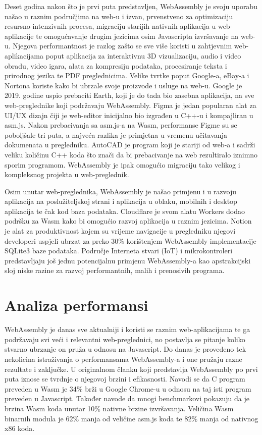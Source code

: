 \documentclass[seminarskirad]{fer}
\begin{document}
Deset godina nakon što je prvi puta predstavljen, WebAssembly je svoju uporabu našao u raznim područjima na web-u i izvan, prvenstveno za optimizaciju resursno intenzivnih procesa, migraciju starijih nativnih aplikacija u web-aplikacije te omogućavanje drugim jezicima osim Javascripta izvršavanje na web-u. Njegova performantnost je razlog zašto se sve više koristi u zahtjevnim web-aplikacijama poput aplikacija za interaktivnu 3D vizualizaciju, audio i video obradu, video igara, alata za kompresiju podataka, procesiranje teksta i prirodnog jezika te PDF preglednicima. Velike tvrtke poput Google-a, eBay-a i Nortona koriste kako bi ubrzale svoje proizvode i usluge na web-u. Google je 2019. godine uspio prebaciti Earth, koji je do tada bio zasebna aplikacija, na sve web-preglednike koji podržavaju WebAssembly. Figma je jedan popularan alat za UI/UX dizajn čiji je web-editor inicijalno bio izgrađen u C++-u i kompajliran u asm.js. Nakon prebacivanja sa asm.js-a na Wasm, performanse Figme su se poboljšale tri puta, a najveća razlika je primjetna u vremenu učitavanja dokumenata u pregledniku. AutoCAD je program koji je stariji od web-a i sadrži veliku količinu C++ koda što znači da bi prebacivanje na web	rezultiralo iznimno sporim programom. WebAssembly je ipak omogućio migraciju tako velikog i kompleksnog projekta u web-preglednik.

Osim unutar web-preglednika, WebAssembly je našao primjenu i u razvoju aplikacija na poslužiteljskoj strani i aplikacija u oblaku, mobilnih i desktop aplikacija te čak kod baza podataka. Cloudflare je svom alatu Workers dodao podršku za Wasm kako bi omogućio razvoj aplikacija u raznim jezicima. Notion je alat za produktivnost kojem su vrijeme navigacije u pregledniku njegovi developeri uspjeli ubrzat za preko 30\% korištenjem WebAssembly implementacije SQLite3 baze podataka. Područje Interneta stvari (IoT) i mikrokontroleri predstavljaju još jednu potencijalnu primjenu WebAssembly-a kao apstrakcijski sloj niske razine za razvoj performantnih, malih i prenosivih programa.


\chapter{Analiza performansi}
\label{pog:performance}

WebAssembly je danas sve aktualniji i koristi se raznim web-aplikacijama te ga podržavaju svi veći i relevantni web-preglednici, no postavlja se pitanje koliko stvarno ubrzanje on pruža u odnosu na Javascript. Do danas je provedeno tek nekolicina istraživanja o performansama WebAssembly-a i one pružaju razne rezultate i zaključke. U originalnom članku koji predstavlja WebAssembly po prvi puta iznose se tvrdnje o njegovoj brzini i efikasnosti. Navodi se da C program preveden u Wasm je 34\% brži u Google Chrome-u u odnosu na taj isti program preveden u Javascript. Također navode da mnogi benchmarkovi pokazuju da je brzina Wasm koda unutar 10\% nativne brzine izvršavanja. Veličina Wasm binarnih modula je 62\% manja od veličine asm.js koda te 82\% manja od nativnog x86 koda.
\end{document}
